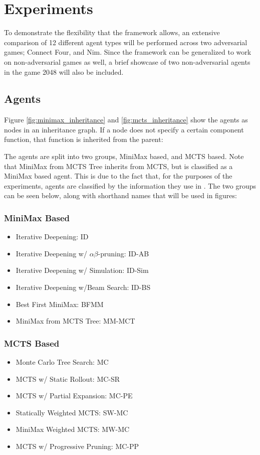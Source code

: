 \section{Experiments}

To demonstrate the flexibility that the framework allows, an extensive comparison of 12 different agent types will be performed across two
adversarial games; Connect Four, and Nim. Since the framework can be generalized to work on non-adversarial games as well, a brief showcase of two non-adversarial agents in the game 2048 will also be included.

\subsection{Agents}

Figure \ref{fig:minimax_inheritance} and \ref{fig:mcts_inheritance} show the agents as nodes in an inheritance graph. If a node does not specify a certain component function, that function is inherited from the parent:





The agents are split into two groups, MiniMax based, and MCTS based. Note that MiniMax from MCTS Tree inherits from MCTS, but is classified as a MiniMax based agent. This is due to the fact that, for the purposes of the experiments, agents are classified by the information they use in \gbm. The two groups can be seen below, along with shorthand names that will be used in figures:

\subsubsection*{MiniMax Based}
\begin{itemize}
    \item Iterative Deepening: ID
    \item Iterative Deepening w/ $\alpha\beta$-pruning: ID-AB
    \item Iterative Deepening w/ Simulation: ID-Sim
    \item Iterative Deepening w/Beam Search: ID-BS
    \item Best First MiniMax: BFMM
    \item MiniMax from MCTS Tree: MM-MCT
\end{itemize}

\subsubsection*{MCTS Based}
\begin{itemize}
    \item Monte Carlo Tree Search: MC
    \item MCTS w/ Static Rollout: MC-SR
    \item MCTS w/ Partial Expansion: MC-PE
    \item Statically Weighted MCTS: SW-MC
    \item MiniMax Weighted MCTS: MW-MC
    \item MCTS w/ Progressive Pruning: MC-PP
\end{itemize}

